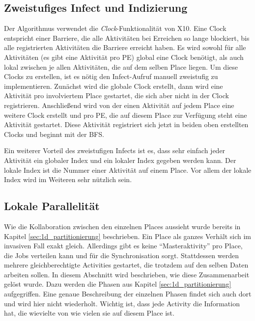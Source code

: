 \subsection{Zweistufiges Infect und Indizierung} %
\label{sub:zweistufiges_infect}
Der Algorithmus verwendet die \textit{Clock}-Funktionalität von X10. Eine Clock entspricht einer Barriere, die alle Aktivitäten bei Erreichen so lange blockiert, bis alle registrierten Aktivitäten die Barriere erreicht haben. Es wird sowohl für alle Aktivitäten (es gibt eine Aktivität pro PE) global eine Clock benötigt, als auch lokal zwischen je allen Aktivitäten, die auf dem selben Place liegen. Um diese Clocks zu erstellen, ist es nötig den Infect-Aufruf manuell zweistufig zu implementieren. Zunächst wird die globale Clock erstellt, dann wird eine Aktivität pro involviertem Place gestartet, die sich aber nicht in der Clock registrieren. Anschließend wird von der einen Aktivität auf jedem Place eine weitere Clock erstellt und pro PE, die auf diesem Place zur Verfügung steht eine Aktivität gestartet. Diese Aktivität registriert sich jetzt in beiden oben erstellten Clocks und beginnt mit der BFS.

Ein weiterer Vorteil des zweistufigen Infects ist es, dass sehr einfach jeder Aktivität ein globaler Index und ein lokaler Index gegeben werden kann. Der lokale Index ist die Nummer einer Aktivität auf einem Place. Vor allem der lokale Index wird im Weiteren sehr nützlich sein.

\subsection{Lokale Parallelität} %
\label{sub:lokale_parallelit_t}
Wie die Kollaboration zwischen den einzelnen Places aussieht wurde bereits in Kapitel \ref{sec:1d_partitionierung} beschrieben. Ein Place als ganzes Verhält sich im invasiven Fall exakt gleich. Allerdings gibt es keine \enquote{Masteraktivity} pro Place, die Jobs verteilen kann und für die Synchronisation sorgt. Stattdessen werden mehrere gleichberechtigte Activities gestartet, die trotzdem auf den selben Daten arbeiten sollen. In diesem Abschnitt wird beschrieben, wie diese Zusammenarbeit gelöst wurde. Dazu werden die Phasen aus Kapitel \ref{sec:1d_partitionierung} aufgegriffen. Eine genaue Beschreibung der einzelnen Phasen findet sich auch dort und wird hier nicht wiederholt. Wichtig ist, dass jede Activity die Information hat, die wievielte von wie vielen sie auf diesem Place ist.

